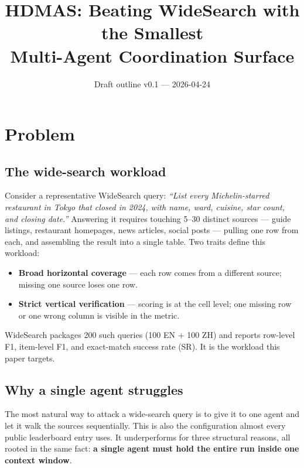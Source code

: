 \documentclass[11pt]{article}
\title{HDMAS: Beating WideSearch with the Smallest\\
       Multi-Agent Coordination Surface}
\author{}
\date{Draft outline v0.1 — 2026-04-24}
\begin{document}
\maketitle

\section{Problem}

\subsection{The wide-search workload}

Consider a representative WideSearch query: \emph{``List every Michelin-starred restaurant in Tokyo that closed in 2024, with name, ward, cuisine, star count, and closing date.''} Answering it requires touching 5--30 distinct sources --- guide listings, restaurant homepages, news articles, social posts --- pulling one row from each, and assembling the result into a single table. Two traits define this workload:

\begin{itemize}[leftmargin=1.2em]
  \item \textbf{Broad horizontal coverage} --- each row comes from a different source; missing one source loses one row.
  \item \textbf{Strict vertical verification} --- scoring is at the cell level; one missing row or one wrong column is visible in the metric.
\end{itemize}

WideSearch packages 200 such queries (100 EN + 100 ZH) and reports row-level F1, item-level F1, and exact-match success rate (SR). It is the workload this paper targets.

\subsection{Why a single agent struggles}

The most natural way to attack a wide-search query is to give it to one agent and let it walk the sources sequentially. This is also the configuration almost every public leaderboard entry uses. It underperforms for three structural reasons, all rooted in the same fact: \textbf{a single agent must hold the entire run inside one context window}.
\end{document}
